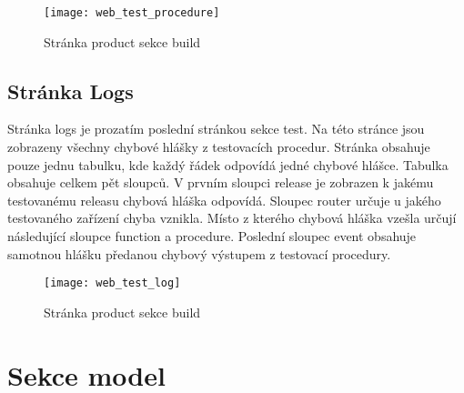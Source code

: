 \begin{figure}[h]
  \centering
  \texttt{[image: web\_test\_procedure]}
  \caption{Stránka product sekce build}
  \label{fig:web_test_device}
\end{figure}

\subsection{Stránka Logs}
Stránka logs je prozatím poslední stránkou sekce test. Na této stránce jsou zobrazeny všechny chybové hlášky z testovacích procedur. Stránka obsahuje pouze jednu tabulku, kde každý řádek odpovídá jedné chybové hlášce. Tabulka obsahuje celkem pět sloupců. V prvním sloupci release je zobrazen k jakému testovanému releasu chybová hláška odpovídá. Sloupec router určuje u jakého testovaného zařízení chyba vznikla. Místo z kterého chybová hláška vzešla určují následující sloupce function a procedure. Poslední sloupec event obsahuje samotnou hlášku předanou chybový výstupem z testovací procedury.

\begin{figure}[h]
  \centering
  \texttt{[image: web\_test\_log]}
  \caption{Stránka product sekce build}
  \label{fig:web_test_device}
\end{figure}

\section{Sekce model}

\endinput
